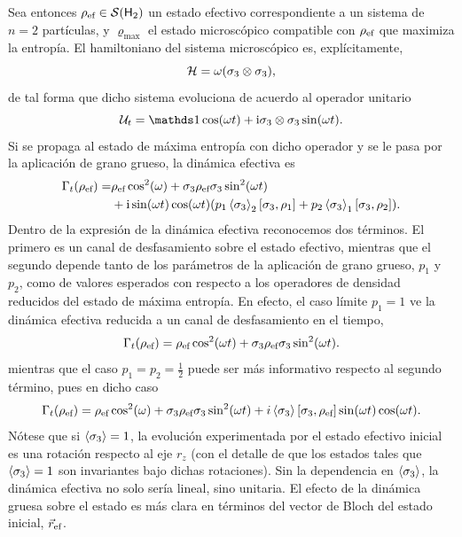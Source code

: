 Sea entonces $\rho_{\text{ef}}\in\mathcal{S}({\sf H}_{2})$ un estado efectivo correspondiente a un sistema de $n=2$ partículas, y $\varrho_{\max}$ el estado microscópico compatible con $\rho_{\text{ef}}$ que maximiza la entropía. El hamiltoniano del sistema microscópico es, explícitamente,
\begin{equation}
    \mathcal{H}=\omega\qty(\sigma_{3}\otimes\sigma_{3}),\nonumber
\end{equation}
de tal forma que dicho sistema evoluciona de acuerdo al operador unitario
\begin{equation}
    \mcU_{t}=\Id \cos(\omega t)+ \rmi \pauli{3}\otimes\pauli{3} \sin(\omega t).\nonumber
\end{equation}
Si se propaga al estado de máxima entropía con dicho operador y se le pasa por la aplicación de grano grueso, la dinámica efectiva es
\begin{align}
    \Gamma_{t}(\rho_{\text{ef}})=&\rho_{\text{ef}} \cos^{2}(\omega)+\sigma_{3} \rho_{\text{ef}} \sigma_{3} \sin^{2}(\omega t)\nonumber\\
    & + \text{i} \sin(\omega t)\cos(\omega t)\qty(p_{1}\expval{\sigma_{3}}_{2}[\sigma_{3},\rho_{1}]+p_{2}\expval{\sigma_{3}}_{1}[\sigma_{3},\rho_{2}]).\nonumber
\end{align}
Dentro de la expresión de la dinámica efectiva reconocemos dos términos. El primero es un canal de desfasamiento sobre el estado efectivo, mientras que el segundo depende tanto de los parámetros de la aplicación de grano grueso, $p_{1}$ y $p_{2}$, como de valores esperados con respecto a los operadores de densidad reducidos del estado de máxima entropía. En efecto, el caso límite $p_{1}=1$ ve la dinámica efectiva reducida a un canal de desfasamiento en el tiempo,
\begin{equation}\label{eq:EffectiveIsing2}
    \Gamma_{t}(\rho_{\text{ef}})=\rho_{\text{ef}} \cos^{2}(\omega t)+\sigma_{3} \rho_{\text{ef}} \sigma_{3} \sin^{2}(\omega t).\nonumber
\end{equation}
mientras que el caso $p_{1}=p_{2}=\frac{1}{2}$ puede ser más informativo respecto al segundo término, pues en dicho caso
\begin{equation}
    \Gamma_{t}(\rho_{\text{ef}})=\rho_{\text{ef}} \cos^{2}(\omega)+\sigma_{3} \rho_{\text{ef}} \sigma_{3} \sin^{2}(\omega t) + i\expval{\sigma_{3}} \qty[\sigma_{3},\rho_{\text{ef}}] \sin(\omega t)\cos(\omega t).\nonumber
\end{equation}
Nótese que si $\expval{\sigma_{3}}=1$, la evolución experimentada por el estado efectivo inicial es una rotación respecto al eje $r_{z}$ (con el detalle de que los estados tales que $\expval{\sigma_{3}}=1$ son invariantes bajo dichas rotaciones). Sin la dependencia en $\expval{\sigma_{3}}$, la dinámica efectiva no solo sería lineal, sino unitaria. El efecto de la dinámica gruesa sobre el estado es más clara en términos del vector de Bloch del estado inicial, $\vec{r}_{\text{ef}}$. 
